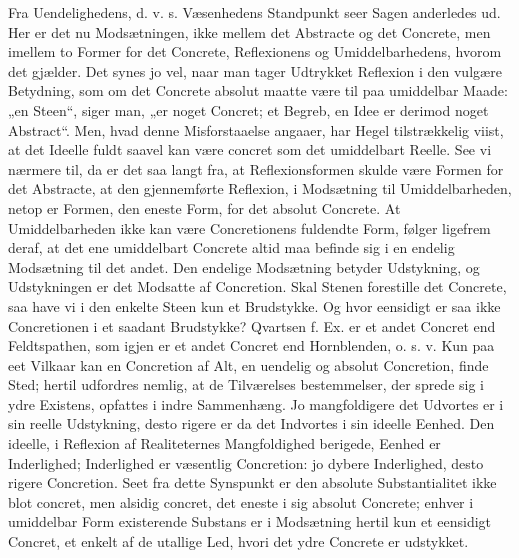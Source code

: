 \documentclass[11pt]{book}
\newcommand{\opage}[1]{\marginnote{\footnotesize\textit{[#1]}}}
\begin{document}
\opage{116} \setcounter{footnote}{0}%
Fra Uendelighedens, d. v. s. Væsenhedens Standpunkt seer Sagen anderledes
ud. Her er det nu Modsætningen, ikke mellem det Abstracte og det
Concrete, men imellem to Former for det Concrete, Reflexionens og
Umiddelbarhedens, hvorom det gjælder. Det synes jo vel, naar man tager
Udtrykket Reflexion i den vulgære Betydning, som om det Concrete absolut
maatte være til paa umiddelbar Maade: „en Steen“, siger man, „er noget
Concret; et Begreb, en Idee er derimod noget Abstract“. Men, hvad denne
Misforstaaelse angaaer, har Hegel tilstrækkelig viist, at det Ideelle
fuldt saavel kan være concret som det umiddelbart Reelle. See vi nærmere
til, da er det saa langt fra, at Reflexionsformen skulde være Formen for
det Abstracte, at den gjennemførte Reflexion, i Modsætning til
Umiddelbarheden, netop er Formen, den eneste Form, for det absolut
Concrete. At Umiddelbarheden ikke kan være Concretionens fuldendte Form,
følger ligefrem deraf, at det ene umiddelbart Concrete altid maa befinde
sig i en endelig Modsætning til det andet. Den endelige Modsætning
betyder Udstykning, og Udstykningen er det Modsatte af Concretion. Skal
Stenen forestille det Concrete, saa have vi i den enkelte Steen kun et
Brudstykke. Og hvor eensidigt er saa ikke Concretionen i et saadant
Brudstykke? Qvartsen f. Ex. er et andet Concret end Feldtspathen, som
igjen er et andet Concret end Hornblenden, o. s. v. Kun paa eet Vilkaar
kan en Concretion af Alt, en uendelig og absolut Concretion, finde Sted;
hertil udfordres nemlig, at de Tilværelses\-%
bestemmelser, der sprede sig i ydre Existens, opfattes i indre
Sammenhæng. Jo mangfoldigere det Udvortes er i sin reelle Udstykning,
desto rigere er da det Indvortes i sin ideelle Eenhed. Den ideelle, i
Reflexion af Realiteternes Mangfoldighed berigede, Eenhed er Inderlighed;
Inderlighed er væsentlig Concretion: jo dybere Inderlighed, desto rigere
Concretion. Seet fra dette Synspunkt er den absolute Substantialitet ikke
blot concret, men alsidig concret, det eneste i
\opage{117} \setcounter{footnote}{0}%
sig absolut Concrete; enhver i umiddelbar Form existerende Substans er i
Modsætning hertil kun et eensidigt Concret, et enkelt af de utallige Led,
hvori det ydre Concrete er udstykket.
\end{document}
